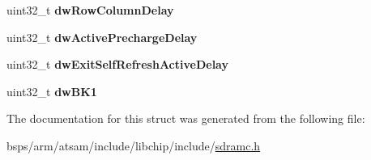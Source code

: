 \begin{DoxyCompactItemize}
uint32\+\_\+t {\bfseries dw\+Row\+Column\+Delay}
\item 
\mbox{\label{struct__SSdramc__config_a5efa7d4fe5a2ca332e73733afedb952e}} 
uint32\+\_\+t {\bfseries dw\+Active\+Precharge\+Delay}
\item 
\mbox{\label{struct__SSdramc__config_aaa6dbce1af1ac9718755d342c5f60044}} 
uint32\+\_\+t {\bfseries dw\+Exit\+Self\+Refresh\+Active\+Delay}
\item 
\mbox{\label{struct__SSdramc__config_aca6debd7ca54ed316637444cfdd42003}} 
uint32\+\_\+t {\bfseries dw\+B\+K1}
\end{DoxyCompactItemize}


The documentation for this struct was generated from the following file\+:\begin{DoxyCompactItemize}
\item 
bsps/arm/atsam/include/libchip/include/\mbox{\hyperlink{sdramc_8h}{sdramc.\+h}}\end{DoxyCompactItemize}
